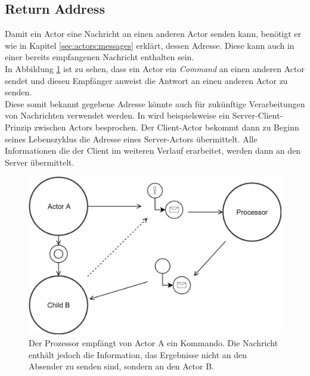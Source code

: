 
\subsection{Return Address}
Damit ein Actor eine Nachricht an einen anderen Actor senden kann, benötigt er wie in Kapitel \ref{sec:actors:messages} erklärt, dessen Adresse. Diese kann auch in einer bereits empfangenen Nachricht enthalten sein. \\
In Abbildung \ref{fig:actor:patterns:returnAddress} ist zu sehen, dass ein Actor ein \textit{Command} an einen anderen Actor sendet und diesen Empfänger anweist die Antwort an einen anderen Actor zu senden. \\
Diese somit bekannt gegebene Adresse könnte auch für zukünftige Verarbeitungen von Nachrichten verwendet werden. In \cite{Vernon2015ReactiveAkka} wird beispielsweise ein Server-Client-Prinzip zwischen Actors besprochen. Der Client-Actor bekommt dann zu Beginn seines Lebenszyklus die Adresse eines Server-Actors übermittelt. Alle Informationen die der Client im weiteren Verlauf erarbeitet, werden dann an den Server übermittelt.

\begin{figure}
  \centering
  \includegraphics[width=\linewidth]{gfx/actor/patterns/returnAddress}
  \caption{Der Prozessor empfängt von Actor A ein Kommando. Die Nachricht enthält jedoch die Information, das Ergebnisse nicht an den Absender zu senden sind, sondern an den Actor B.}
  \label{fig:actor:patterns:returnAddress}
\end{figure}


